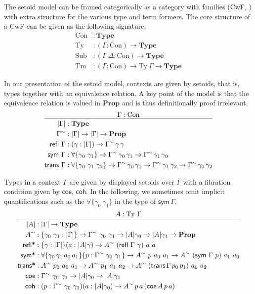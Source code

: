 \documentclass[autoref]{llncs}
\newcommand{\GG}{\Gamma}
\newcommand{\GD}{\Delta}
\newcommand{\mType}{\mathbf{Type}}
\newcommand{\mProp}{\mathbf{Prop}}
\newcommand{\Con}{\mathrm{Con}}
\newcommand{\Ty}{\mathrm{Ty}}
\newcommand{\Tm}{\mathrm{Tm}}
\newcommand{\Sub}{\mathrm{Sub}}
\begin{document}
The setoid model can be framed categorically as a category with families (CwF,
\cite{internal-tt}) with extra structure for the various type and term
formers. The core structure of a CwF can be given as the following signature:
\vspace{-0.2em}
\begin{align*}
  \Con &: \mType \\
  \Ty &: (\GG : \Con) \to \mType \\
  \Sub &: (\GG\ \GD : \Con) \to \mType \\
  \Tm &: (\GG : \Con) \to \Ty\ \GG \to \mType
\end{align*}

In our presentation of the setoid model, contexts are given by setoids, that is,
types together with an equivalence relation. A key point of the model is that the
equivalence relation is valued in $\mProp$ and is thus definitionally proof
irrelevant.
\[
\infer{
  \begin{aligned}
    | \GG | &: \mType \\
    \GG^\sim &: | \GG | \to | \GG | \to \mProp \\
    \textsf{refl}\ \GG &: (\gamma : | \GG |) \to \GG^\sim\,\gamma\,\gamma \\
    \textsf{sym} \ \GG &: \forall\{\gamma_0\ \gamma_1\} \to \GG^\sim\,\gamma_0\,\gamma_1
    \to \GG^\sim\,\gamma_1\,\gamma_0 \\
    \textsf{trans} \ \GG &: \forall\{\gamma_0\ \gamma_1\ \gamma_2\}
    \to \GG^\sim\,\gamma_0\,\gamma_1
    \to \GG^\sim\,\gamma_1\,\gamma_2
    \to \GG^\sim\,\gamma_0\,\gamma_2
  \end{aligned}
}{
  \GG : \Con
}
\]

Types in a context $\GG$ are given by displayed setoids over $\GG$
with a fibration condition given by $\textsf{coe}$, $\textsf{coh}$. In
the following, we sometimes omit implicit quantifications such as the $\forall\{\gamma_0\ \gamma_1\}$ in the type of $\textsf{sym}\,\GG$.
\[
\infer{
  \begin{aligned}
    | A | &: | \GG | \to \mType \\
    A^\sim &: \{\gamma_0\ \gamma_1 : | \GG |\}
    \to \GG^\sim\ \gamma_0\ \gamma_1 \to | A | \gamma_0 \to | A | \gamma_1 \to \mProp \\
    \textsf{refl*} &: \{\gamma : | \GG | \} (a : | A | \gamma) \to A^\sim\ (\textsf{refl}\ \GG\ \gamma)\ a\ a \\
    \textsf{sym*} &: \forall\{\gamma_0\,\gamma_1\,a_0\,a_1\}\{p : \GG^\sim\ \gamma_0\ \gamma_1\}
    \to A^\sim\ p\ a_0\ a_1 \to A^\sim\ (\textsf{sym}\ \GG\ p)\ a_1\ a_0 \\
    \textsf{trans*} &: A^\sim\ p_0\ a_0\ a_1\to A^\sim\ p_1\ a_1\ a_2\to A^\sim\ (\textsf{trans}\,\GG\,p_0\,p_1)\ a_0\ a_2\\
    \textsf{coe} &: \GG^\sim\ \gamma_0\ \gamma_1 \to | A | \gamma_0 \to | A | \gamma_1 \\
    \textsf{coh} &: (p : \GG^\sim\ \gamma_0\ \gamma_1) (a : | A | \gamma_0)
    \to A^\sim\,p\,a\,(\textsf{coe}\,A\,p\,a) \\
  \end{aligned}
}{
  A : \Ty\ \GG
}
\]
\end{document}
